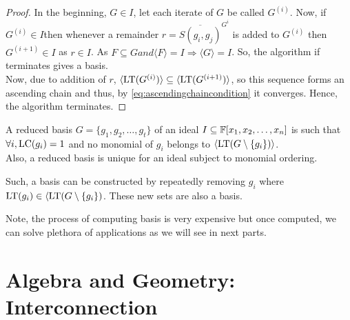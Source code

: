 \documentclass[a4paper,11pt]{article}
\begin{document}
\begin{proof}
    In the beginning, $G\in I$, let each iterate of $G$ be called $G^{(i)}$. Now, if $G^{(i)}\in I$then whenever a remainder $r=\overline{S(g_i,g_j)}^{G^{i}}$ is added to $G^{(i)}$ then $G^{(i+1)}\in I$ as $r\in I$. As $F\subseteq G and \langle F\rangle=I\Rightarrow \langle G\rangle=I$. So, the algorithm if terminates gives a \Grob basis.\\
    Now, due to addition of $r$, $\langle \operatorname{LT}(G^{(i)})\rangle\subseteq\langle \operatorname{LT}(G^{(i+1)})\rangle$, so this sequence forms an ascending chain and thus, by \ref{eq:ascendingchaincondition} it converges. Hence, the algorithm terminates.
\end{proof}
\begin{defn}
    A reduced \Grob basis $G = \{g_1, g_2, \ldots, g_t\}$ of an ideal $I\subseteq\mathbb{F}[x_1, x_2, \ldots, x_n]$ is such that $\forall i, \operatorname{LC}(g_i)=1$ and no monomial of $g_i$ belongs to $\langle \operatorname{LT}(G\setminus\{g_i\})\rangle$.\\
    Also, a reduced \Grob basis is unique for an ideal subject to monomial ordering.
\end{defn}
Such, a \Grob basis can be constructed by repeatedly removing $g_i$ where $\operatorname{LT}(g_i)\in\langle \operatorname{LT}(G\setminus\{g_i\})$. These new sets are also a \Grob basis.

Note, the process of computing \Grob basis is very expensive but once computed, we can solve plethora of applications as we will see in next parts.
\clearpage
\part{Algebra and Geometry: Interconnection}
\end{document}
